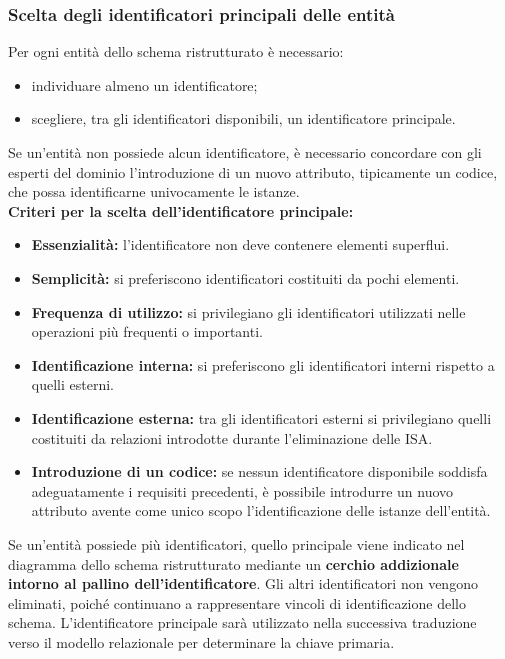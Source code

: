 \subsubsection{Scelta degli identificatori principali
delle entità}

Per ogni entità dello schema ristrutturato
è necessario:

\begin{itemize}
    \item individuare almeno un identificatore;
    \item scegliere, tra gli identificatori
    disponibili, un identificatore principale.
\end{itemize}
\noindent
Se un'entità non possiede alcun identificatore,
è necessario concordare con gli esperti del
dominio l'introduzione di un nuovo attributo,
tipicamente un codice, che possa identificarne
univocamente le istanze.\medskip\\
\noindent
\textbf{Criteri per la scelta dell'identificatore
principale:}

\begin{itemize}
    \item \textbf{Essenzialità:} l'identificatore
    non deve contenere elementi superflui.

    \item \textbf{Semplicità:} si preferiscono
    identificatori costituiti da pochi elementi.

    \item \textbf{Frequenza di utilizzo:} si
    privilegiano gli identificatori utilizzati
    nelle operazioni più frequenti o importanti.

    \item \textbf{Identificazione interna:}
    si preferiscono gli identificatori interni
    rispetto a quelli esterni.

    \item \textbf{Identificazione esterna:}
    tra gli identificatori esterni si privilegiano
    quelli costituiti da relazioni introdotte
    durante l'eliminazione delle ISA.

    \item \textbf{Introduzione di un codice:}
    se nessun identificatore disponibile soddisfa
    adeguatamente i requisiti precedenti, è
    possibile introdurre un nuovo attributo
    avente come unico scopo l'identificazione
    delle istanze dell'entità.
\end{itemize}
\noindent
Se un'entità possiede più identificatori, quello
principale viene indicato nel diagramma dello
schema ristrutturato mediante un
\textbf{cerchio addizionale intorno al pallino
dell'identificatore}.
Gli altri identificatori non vengono eliminati,
poiché continuano a rappresentare vincoli
di identificazione dello schema.
L'identificatore principale sarà utilizzato
nella successiva traduzione verso il modello
relazionale per determinare la chiave primaria.


